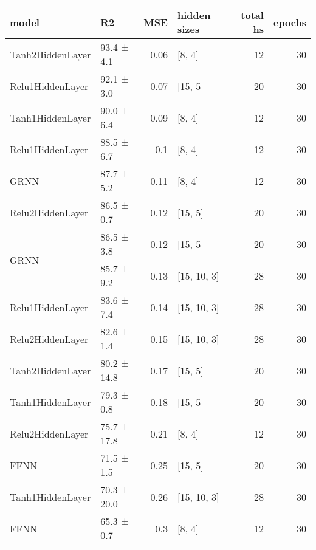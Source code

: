 
    \begin{table*}
        \centering
        \begin{tabular}{llrlrr}
\hline
 model                                      & R2          &   MSE & hidden sizes   &   total hs &   epochs \\
\hline
 \hline
Tanh2HiddenLayer                    & 93.4 ± 4.1  &  0.06 & [8, 4]         &         12 &       30 \\
 \hline
Relu1HiddenLayer                    & 92.1 ± 3.0  &  0.07 & [15, 5]        &         20 &       30 \\
 \hline
Tanh1HiddenLayer                    & 90.0 ± 6.4  &  0.09 & [8, 4]         &         12 &       30 \\
 \hline
Relu1HiddenLayer                    & 88.5 ± 6.7  &  0.1  & [8, 4]         &         12 &       30 \\
 \hline
GRNN                                & 87.7 ± 5.2  &  0.11 & [8, 4]         &         12 &       30 \\
 \hline
Relu2HiddenLayer                    & 86.5 ± 0.7  &  0.12 & [15, 5]        &         20 &       30 \\
 \hline
\multirow{2}{*}{GRNN}               & 86.5 ± 3.8  &  0.12 & [15, 5]        &         20 &       30 \\
                                            & 85.7 ± 9.2  &  0.13 & [15, 10, 3]    &         28 &       30 \\
 \hline
Relu1HiddenLayer                    & 83.6 ± 7.4  &  0.14 & [15, 10, 3]    &         28 &       30 \\
 \hline
Relu2HiddenLayer                    & 82.6 ± 1.4  &  0.15 & [15, 10, 3]    &         28 &       30 \\
 \hline
Tanh2HiddenLayer                    & 80.2 ± 14.8 &  0.17 & [15, 5]        &         20 &       30 \\
 \hline
Tanh1HiddenLayer                    & 79.3 ± 0.8  &  0.18 & [15, 5]        &         20 &       30 \\
 \hline
Relu2HiddenLayer                    & 75.7 ± 17.8 &  0.21 & [8, 4]         &         12 &       30 \\
 \hline
FFNN                                & 71.5 ± 1.5  &  0.25 & [15, 5]        &         20 &       30 \\
 \hline
Tanh1HiddenLayer                    & 70.3 ± 20.0 &  0.26 & [15, 10, 3]    &         28 &       30 \\
 \hline
\multirow{2}{*}{FFNN}               & 65.3 ± 0.7  &  0.3  & [8, 4]         &         12 &       30 \\

\end{tabular}
\end{table*}
